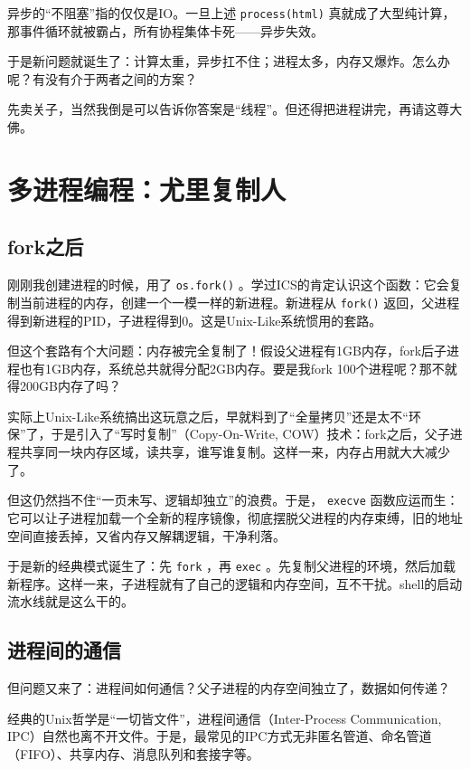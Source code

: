 异步的“不阻塞”指的仅仅是IO。一旦上述 \texttt{process(html)} 真就成了大型纯计算，那事件循环就被霸占，所有协程集体卡死——异步失效。

于是新问题就诞生了：计算太重，异步扛不住；进程太多，内存又爆炸。怎么办呢？有没有介于两者之间的方案？

先卖关子，当然我倒是可以告诉你答案是“线程”。但还得把进程讲完，再请这尊大佛。

\section{多进程编程：尤里复制人}

\subsection{fork之后}

刚刚我创建进程的时候，用了 \texttt{os.fork()} 。学过ICS的肯定认识这个函数：它会复制当前进程的内存，创建一个一模一样的新进程。新进程从 \texttt{fork()} 返回，父进程得到新进程的PID，子进程得到0。这是Unix-Like系统惯用的套路。

但这个套路有个大问题：内存被完全复制了！假设父进程有1GB内存，fork后子进程也有1GB内存，系统总共就得分配2GB内存。要是我fork 100个进程呢？那不就得200GB内存了吗？

实际上Unix-Like系统搞出这玩意之后，早就料到了“全量拷贝”还是太不“环保”了，于是引入了“写时复制”（Copy-On-Write, COW）技术：fork之后，父子进程共享同一块内存区域，读共享，谁写谁复制。这样一来，内存占用就大大减少了。

但这仍然挡不住“一页未写、逻辑却独立”的浪费。于是， \texttt{execve} 函数应运而生：它可以让子进程加载一个全新的程序镜像，彻底摆脱父进程的内存束缚，旧的地址空间直接丢掉，又省内存又解耦逻辑，干净利落。

于是新的经典模式诞生了：先 \texttt{fork} ，再 \texttt{exec} 。先复制父进程的环境，然后加载新程序。这样一来，子进程就有了自己的逻辑和内存空间，互不干扰。shell的启动流水线就是这么干的。

\subsection{进程间的通信}

但问题又来了：进程间如何通信？父子进程的内存空间独立了，数据如何传递？

经典的Unix哲学是“一切皆文件”，进程间通信（Inter-Process Communication, IPC）自然也离不开文件。于是，最常见的IPC方式无非匿名管道、命名管道（FIFO）、共享内存、消息队列和套接字等。

